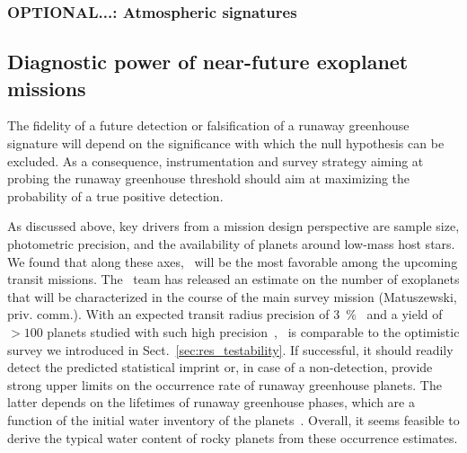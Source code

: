 \documentclass[twocolumn]{aastex631}
\begin{document}
\subsubsection{OPTIONAL...: Atmospheric signatures}\label{sec:dis_atmospheres}


\subsection{Diagnostic power of near-future exoplanet missions}\label{sec:dis_samplesize}
The fidelity of a future detection or falsification of a runaway greenhouse signature will depend on the significance with which the null hypothesis can be excluded.
As a consequence, instrumentation and survey strategy aiming at probing the runaway greenhouse threshold should aim at maximizing the probability of a true positive detection.

As discussed above, key drivers from a mission design perspective are sample size, photometric precision, and the availability of planets around low-mass host stars.
We found that along these axes, \plato\ will be the most favorable among the upcoming transit missions.
The \plato\ team has released an estimate on the number of exoplanets that will be characterized in the course of the main survey mission (Matuszewski, priv. comm.).
With an expected transit radius precision of \SI{3}{\percent}~\citep{plato2017} and a yield of $> 100$ planets studied with such high precision~\citep{Rauer2021}, \plato\ is comparable to the optimistic survey we introduced in Sect.~\ref{sec:res_testability}.
If successful, it should readily detect the predicted statistical imprint or, in case of a non-detection, provide strong upper limits on the occurrence rate of runaway greenhouse planets.
The latter depends on the lifetimes of runaway greenhouse phases, which are a function of the initial water inventory of the planets~\citep{Hamano2015}.
Overall, it seems feasible to derive the typical water content of rocky planets from these occurrence estimates.
\end{document}

